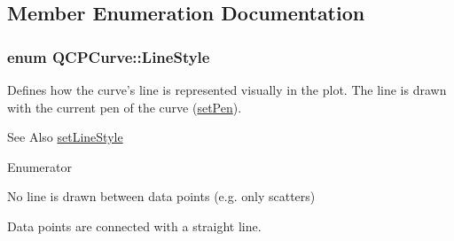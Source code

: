 \subsection{Member Enumeration Documentation}
\hypertarget{classQCPCurve_a2710e9f79302152cff794c6e16cc01f1}{
\subsubsection[{Line\-Style}]{\setlength{\rightskip}{0pt plus 5cm}enum {\bf Q\-C\-P\-Curve\-::\-Line\-Style}}}\label{classQCPCurve_a2710e9f79302152cff794c6e16cc01f1}
Defines how the curve's line is represented visually in the plot. The line is drawn with the current pen of the curve (\hyperlink{classQCPAbstractPlottable_ab74b09ae4c0e7e13142fe4b5bf46cac7}{set\-Pen}). \begin{DoxySeeAlso}{See Also}
\hyperlink{classQCPCurve_a4a377ec863ff81a1875c3094a6177c19}{set\-Line\-Style} 
\end{DoxySeeAlso}
\begin{Desc}
\item[Enumerator]\par
\begin{description}
\item[{\em 
\hypertarget{classQCPCurve_a2710e9f79302152cff794c6e16cc01f1aec1601a191cdf0b4e761c4c66092cc48}{ls\-None}\label{classQCPCurve_a2710e9f79302152cff794c6e16cc01f1aec1601a191cdf0b4e761c4c66092cc48}
}]No line is drawn between data points (e.\-g. only scatters) \item[{\em 
\hypertarget{classQCPCurve_a2710e9f79302152cff794c6e16cc01f1ade5822ce6fbf131d3df131795c2e1003}{ls\-Line}\label{classQCPCurve_a2710e9f79302152cff794c6e16cc01f1ade5822ce6fbf131d3df131795c2e1003}
}]Data points are connected with a straight line. \end{description}
\end{Desc}


